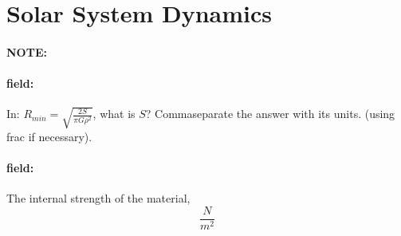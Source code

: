 \documentclass[12pt]{article}
\newenvironment{note}{\paragraph{NOTE:}}{}
\newenvironment{field}{\paragraph{field:}}{}
\begin{document}
\section{Solar System Dynamics}
\begin{note}
   \begin{field}
       In: \(R_{min}=\sqrt{\frac{2S}{\pi G \rho^2}}\), what is \(S\)? Commaseparate the answer with its units. (using frac if necessary).
   \end{field}
   \begin{field}
		The internal strength of the material,
		\[
			\frac{N}{m^2}
		\]
   \end{field}
\end{note}
\end{document}
